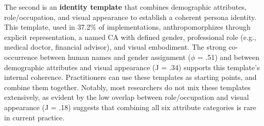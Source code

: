 \documentclass[manuscript,anonymous,sigconf]{acmart}
\begin{document}
The second is an \textbf{identity template} that combines demographic attributes, role/occupation, and visual appearance to establish a coherent persona identity. This template, used in 37.2\% of implementations, anthropomorphizes through explicit representation, a named CA with defined gender, professional role (e.g., medical doctor, financial advisor), and visual embodiment. The strong co-occurrence between human names and gender assignment ($\phi$ = .51) and between demographic attributes and visual appearance (J = .34) supports this template's internal coherence. Practitioners can use these templates as starting points, and combine them together. Notably, most researchers do not mix these templates extensively, as evident by the low overlap between role/occupation and visual appearance (J = .18) suggests that combining all six attribute categories is rare in current practice.
\end{document}
